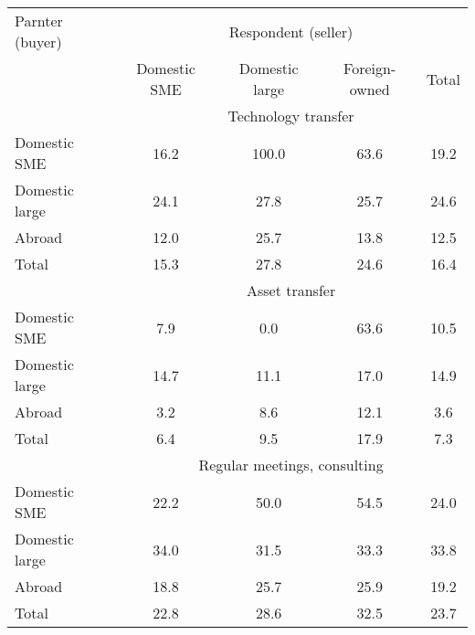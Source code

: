 
\begin{tabular}{lcccc} \hline
Parnter (buyer) &	\multicolumn{4}{c}{Respondent (seller)}	\\		
	&Domestic SME	&Domestic large	&Foreign-owned	&Total\\
	\hline
	\hline
&\multicolumn{4}{c}{Technology transfer}\\
Domestic SME&	16.2&	100.0&	63.6&	19.2\\
Domestic large&	24.1&	27.8&	25.7&	24.6\\
Abroad&	12.0&	25.7&	13.8&	12.5\\
Total&	15.3&	27.8&	24.6&	16.4\\
\hline
&\multicolumn{4}{c}{Asset transfer}\\
Domestic SME&	7.9&	0.0&	63.6&	10.5\\
Domestic large&	14.7&	11.1&	17.0&	14.9\\
Abroad&	3.2&	8.6&	12.1&	3.6\\
Total&	6.4&	9.5&	17.9&	7.3\\
\hline
&\multicolumn{4}{c}{Regular meetings, consulting}\\
Domestic SME&	22.2&	50.0&	54.5&	24.0\\
Domestic large&	34.0&	31.5&	33.3&	33.8\\
Abroad&	18.8&	25.7&	25.9&	19.2\\
Total&	22.8&	28.6&	32.5&	23.7\\
\hline
\end{tabular}
